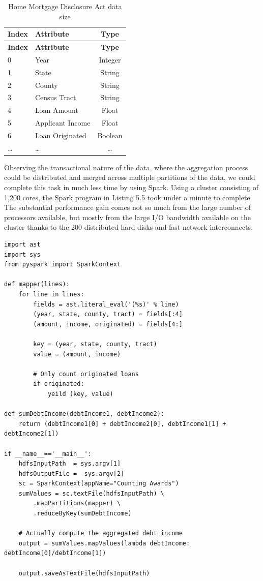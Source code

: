 \documentclass[]{krantz}
\begin{document}
\begin{longtable}[]{@{}llc@{}}
\caption{\label{tab:table5-2} Home Mortgage Disclosure Act data
size}\tabularnewline
\toprule
\textbf{Index} & \textbf{Attribute} & \textbf{Type}\tabularnewline
\midrule
\endfirsthead
\toprule
\textbf{Index} & \textbf{Attribute} & \textbf{Type}\tabularnewline
\midrule
\endhead
0 & Year & Integer\tabularnewline
1 & State & String\tabularnewline
2 & County & String\tabularnewline
3 & Census Tract & String\tabularnewline
4 & Loan Amount & Float\tabularnewline
5 & Applicant Income & Float\tabularnewline
6 & Loan Originated & Boolean\tabularnewline
\ldots{} & \ldots{} & \ldots{}\tabularnewline
\bottomrule
\end{longtable}

Observing the transactional nature of the data, where the aggregation
process could be distributed and merged across multiple partitions of
the data, we could complete this task in much less time by using Spark.
Using a cluster consisting of 1,200 cores, the Spark program in Listing
5.5 took under a minute to complete. The substantial performance gain
comes not so much from the large number of processors available, but
mostly from the large I/O bandwidth available on the cluster thanks to
the 200 distributed hard disks and fast network interconnects.

\hypertarget{lst:hdma}{\label{lst:hdma}}
\begin{verbatim}
import ast
import sys
from pyspark import SparkContext

def mapper(lines):
    for line in lines:
        fields = ast.literal_eval('(%s)' % line)
        (year, state, county, tract) = fields[:4]
        (amount, income, originated) = fields[4:]

        key = (year, state, county, tract)
        value = (amount, income)

        # Only count originated loans
        if originated:
            yeild (key, value)

def sumDebtIncome(debtIncome1, debtIncome2):
    return (debtIncome1[0] + debtIncome2[0], debtIncome1[1] + debtIncome2[1])

if __name__=='__main__':
    hdfsInputPath  = sys.argv[1]
    hdfsOutputFile =  sys.argv[2]
    sc = SparkContext(appName="Counting Awards")
    sumValues = sc.textFile(hdfsInputPath) \
        .mapPartitions(mapper) \
        .reduceByKey(sumDebtIncome)

    # Actually compute the aggregated debt income
    output = sumValues.mapValues(lambda debtIncome: debtIncome[0]/debtIncome[1])

    output.saveAsTextFile(hdfsInputPath)
\end{verbatim}
\end{document}
